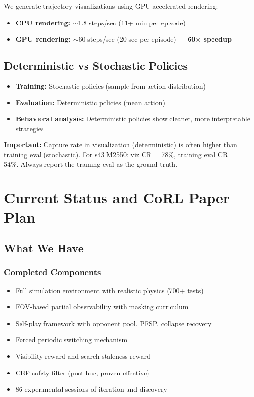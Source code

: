 \documentclass[11pt,a4paper]{report}
\begin{document}
We generate trajectory visualizations using GPU-accelerated rendering:
\begin{itemize}
    \item \textbf{CPU rendering:} $\sim$1.8 steps/sec (11+ min per episode)
    \item \textbf{GPU rendering:} $\sim$60 steps/sec (20 sec per episode) --- \textbf{60$\times$ speedup}
\end{itemize}

\section{Deterministic vs Stochastic Policies}

\begin{itemize}
    \item \textbf{Training:} Stochastic policies (sample from action distribution)
    \item \textbf{Evaluation:} Deterministic policies (mean action)
    \item \textbf{Behavioral analysis:} Deterministic policies show cleaner, more interpretable strategies
\end{itemize}

\begin{warningbox}
\textbf{Important:} Capture rate in visualization (deterministic) is often higher than training eval (stochastic). For s43 M2550: viz CR = 78\%, training eval CR = 54\%. Always report the training eval as the ground truth.
\end{warningbox}

\chapter{Current Status and CoRL Paper Plan}
\label{chap:corl}

\section{What We Have}

\subsection{Completed Components}
\begin{itemize}
    \item Full simulation environment with realistic physics (700+ tests)
    \item FOV-based partial observability with masking curriculum
    \item Self-play framework with opponent pool, PFSP, collapse recovery
    \item Forced periodic switching mechanism
    \item Visibility reward and search staleness reward
    \item CBF safety filter (post-hoc, proven effective)
    \item 86 experimental sessions of iteration and discovery
\end{itemize}
\end{document}
